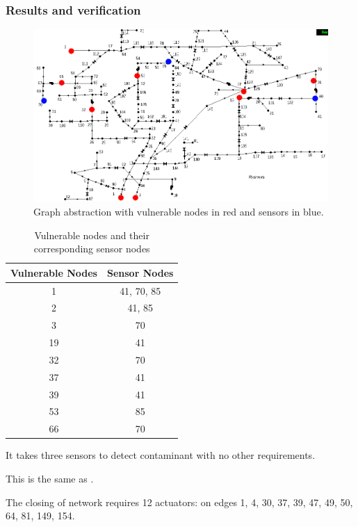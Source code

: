\documentclass[authoryear,preprint,review,12pt]{elsarticle}
\begin{document}
\subsubsection{Results and verification}

\begin{figure}[ht]
\includegraphics[scale=0.4]{images/netowrkSensorsOnly}\caption{Graph abstraction with vulnerable nodes in red and sensors in blue.}
\end{figure}


\begin{table}[ht]
\centering{}%
\begin{tabular}{|c|c|}
\hline
Vulnerable Nodes & Sensor Nodes\tabularnewline
\hline
\hline
1 & 41, 70, 85\tabularnewline
\hline
2 & 41, 85\tabularnewline
\hline
3 & 70\tabularnewline
\hline
19 & 41\tabularnewline
\hline
32 & 70\tabularnewline
\hline
37 & 41\tabularnewline
\hline
39 & 41\tabularnewline
\hline
53 & 85\tabularnewline
\hline
66 & 70\tabularnewline
\hline
\end{tabular}\caption{Vulnerable nodes and their corresponding sensor nodes}
\end{table}


It takes three sensors to detect contaminant with no other requirements.

This is the same as \cite{Palleti2016246}.

The closing of network requires 12 actuators: on edges 1, 4, 30, 37,
39, 47, 49, 50, 64, 81, 149, 154.
\end{document}
